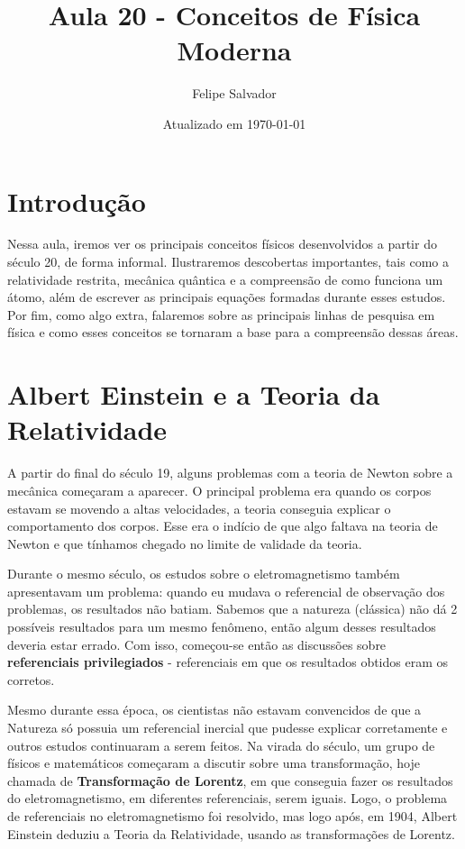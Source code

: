 \documentclass[12pt]{extarticle}
\title{Aula 20 - Conceitos de Física Moderna}
\author{Felipe Salvador}
\date{Atualizado em \today}
\newcommand{\<}{\langle}
\renewcommand{\>}{\rangle}
\theoremstyle{definition}
\begin{document}
\maketitle

\section{Introdução}
Nessa aula, iremos ver os principais conceitos físicos desenvolvidos a partir do século 20, de forma informal. Ilustraremos descobertas importantes, tais como a relatividade restrita, mecânica quântica e a compreensão de como funciona um átomo, além de escrever as principais equações formadas durante esses estudos. Por fim, como algo extra, falaremos sobre as principais linhas de pesquisa em física e como esses conceitos se tornaram a base para a compreensão dessas áreas.

\section{Albert Einstein e a Teoria da Relatividade}
A partir do final do século 19, alguns problemas com a teoria de Newton sobre a mecânica começaram a aparecer. O principal problema era quando os corpos estavam se movendo a altas velocidades, a teoria conseguia explicar o comportamento dos corpos. Esse era o indício de que algo faltava na teoria de Newton e que tínhamos chegado no limite de validade da teoria.

Durante o mesmo século, os estudos sobre o eletromagnetismo também apresentavam um problema: quando eu mudava o referencial de observação dos problemas, os resultados não batiam. Sabemos que a natureza (clássica) não dá 2 possíveis resultados para um mesmo fenômeno, então algum desses resultados deveria estar errado. Com isso, começou-se então as discussões sobre \textbf{referenciais privilegiados} - referenciais em que os resultados obtidos eram os corretos.

Mesmo durante essa época, os cientistas não estavam convencidos de que a Natureza só possuia um referencial inercial que pudesse explicar corretamente e outros estudos continuaram a serem feitos. Na virada do século, um grupo de físicos e matemáticos começaram a discutir sobre uma transformação, hoje chamada de \textbf{Transformação de Lorentz}, em que  conseguia fazer os resultados do eletromagnetismo, em diferentes referenciais, serem iguais. Logo, o problema de referenciais no eletromagnetismo foi resolvido, mas logo após, em 1904, Albert Einstein deduziu a Teoria da Relatividade, usando as transformações de Lorentz.
\end{document}
